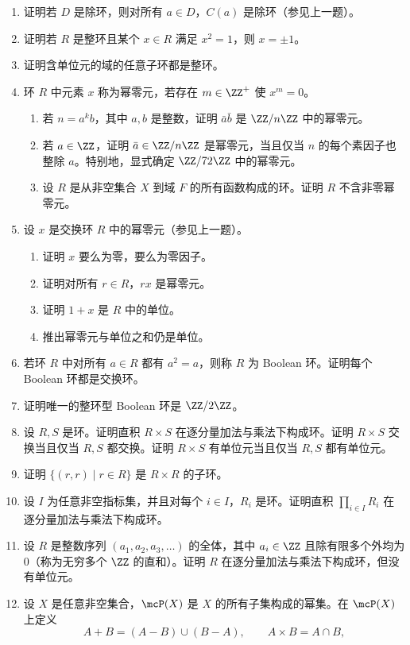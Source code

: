 \begin{enumerate}[label=\arabic*.]
	\item 证明若 $D$ 是除环，则对所有 $a\in D$，$C(a)$ 是除环（参见上一题）。
	\item 证明若 $R$ 是整环且某个 $x\in R$ 满足 $x^2=1$，则 $x=\pm1$。
	\item 证明含单位元的域的任意子环都是整环。
	\item 环 $R$ 中元素 $x$ 称为幂零元，若存在 $m\in\ZZ^+$ 使 $x^m=0$。
	\begin{enumerate}[label=(\alph*)]
		\item 若 $n=a^k b$，其中 $a,b$ 是整数，证明 $\bar a\bar b$ 是 $\ZZ/n\ZZ$ 中的幂零元。
		\item 若 $a\in\ZZ$，证明 $\bar a\in\ZZ/n\ZZ$ 是幂零元，当且仅当 $n$ 的每个素因子也整除 $a$。特别地，显式确定 $\ZZ/72\ZZ$ 中的幂零元。
		\item 设 $R$ 是从非空集合 $X$ 到域 $F$ 的所有函数构成的环。证明 $R$ 不含非零幂零元。
	\end{enumerate}
	\item 设 $x$ 是交换环 $R$ 中的幂零元（参见上一题）。
	\begin{enumerate}[label=(\alph*)]
		\item 证明 $x$ 要么为零，要么为零因子。
		\item 证明对所有 $r\in R$，$rx$ 是幂零元。
		\item 证明 $1+x$ 是 $R$ 中的单位。
		\item 推出幂零元与单位之和仍是单位。
	\end{enumerate}
	\item 若环 $R$ 中对所有 $a\in R$ 都有 $a^2=a$，则称 $R$ 为 Boolean 环。证明每个 Boolean 环都是交换环。
	\item 证明唯一的整环型 Boolean 环是 $\ZZ/2\ZZ$。
	\item 设 $R,S$ 是环。证明直积 $R\times S$ 在逐分量加法与乘法下构成环。证明 $R\times S$ 交换当且仅当 $R,S$ 都交换。证明 $R\times S$ 有单位元当且仅当 $R,S$ 都有单位元。
	\item 证明 $\{(r,r)\mid r\in R\}$ 是 $R\times R$ 的子环。
	\item 设 $I$ 为任意非空指标集，并且对每个 $i\in I$，$R_i$ 是环。证明直积 $\prod_{i\in I}R_i$ 在逐分量加法与乘法下构成环。
	\item 设 $R$ 是整数序列 $(a_1,a_2,a_3,\ldots)$ 的全体，其中 $a_i\in\ZZ$ 且除有限多个外均为 $0$（称为无穷多个 $\ZZ$ 的直和）。证明 $R$ 在逐分量加法与乘法下构成环，但没有单位元。
	\item 设 $X$ 是任意非空集合，$\mcP(X)$ 是 $X$ 的所有子集构成的幂集。在 $\mcP(X)$ 上定义
	\[
	A+B=(A-B)\cup(B-A),\qquad A\times B=A\cap B,
\]
\end{enumerate}
